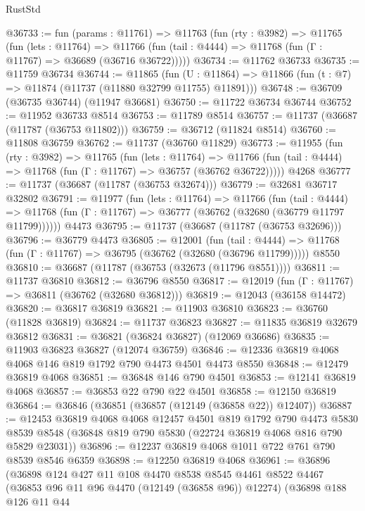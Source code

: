 \begin{lexlean}{RustStd}
\begin{coremodule}
@36733 := fun (params : @11761) =>
  @11763
    (fun (rty : @3982) =>
    @11765
      (fun (lets : @11764) =>
      @11766 (fun (tail : @4444) => @11768 (fun (Γ : @11767) => @36689 (@36716 @36722)))))
@36734 := @11762 @36733
@36735 := @11759 @36734
@36744 := @11865
    (fun (U : @11864) => @11866 (fun (t : @7) => @11874 (@11737 (@11880 @32799 @11755) @11891)))
@36748 := @36709 (@36735 @36744) (@11947 @36681)
@36750 := @11722 @36734 @36744
@36752 := @11952 @36733 @8514
@36753 := @11789 @8514
@36757 := @11737 (@36687 (@11787 (@36753 @11802)))
@36759 := @36712 (@11824 @8514)
@36760 := @11808 @36759
@36762 := @11737 (@36760 @11829)
@36773 := @11955
    (fun (rty : @3982) =>
    @11765
      (fun (lets : @11764) =>
      @11766 (fun (tail : @4444) => @11768 (fun (Γ : @11767) => @36757 (@36762 @36722)))))
    @4268
@36777 := @11737 (@36687 (@11787 (@36753 @32674)))
@36779 := @32681 @36717 @32802
@36791 := @11977
    (fun (lets : @11764) =>
    @11766
      (fun (tail : @4444) =>
      @11768 (fun (Γ : @11767) => @36777 (@36762 (@32680 (@36779 @11797 @11799))))))
    @4473
@36795 := @11737 (@36687 (@11787 (@36753 @32696)))
@36796 := @36779 @4473
@36805 := @12001
    (fun (tail : @4444) => @11768 (fun (Γ : @11767) => @36795 (@36762 (@32680 (@36796 @11799)))))
    @8550
@36810 := @36687 (@11787 (@36753 (@32673 (@11796 @8551))))
@36811 := @11737 @36810
@36812 := @36796 @8550
@36817 := @12019 (fun (Γ : @11767) => @36811 (@36762 (@32680 @36812)))
@36819 := @12043 (@36158 @14472)
@36820 := @36817 @36819
@36821 := @11903 @36810
@36823 := @36760 (@11828 @36819)
@36824 := @11737 @36823
@36827 := @11835 @36819 @32679 @36812
@36831 := @36821 (@36824 @36827) (@12069 @36686)
@36835 := @11903 @36823 @36827 (@12074 @36759)
@36846 := @12336 @36819 @4068 @4068 @146 @819 @1792 @790 @4473 @4501 @4473 @8550
@36848 := @12479 @36819 @4068
@36851 := @36848 @146 @790 @4501
@36853 := @12141 @36819 @4068
@36857 := @36853 @22 @790 @22 @4501
@36858 := @12150 @36819
@36864 := @36846 (@36851 (@36857 (@12149 (@36858 @22)) @12407))
@36887 := @12453
    @36819
    @4068
    @4068
    @12457
    @4501
    @819
    @1792
    @790
    @4473
    @5830
    @8539
    @8548
    (@36848 @819 @790 @5830 (@22724 @36819 @4068 @816 @790 @5829 @23031))
@36896 := @12237 @36819 @4068 @1011 @722 @761 @790 @8539 @8546 @6359
@36898 := @12250 @36819 @4068
@36961 := @36896
    (@36898
      @124
      @427
      @11
      @108
      @4470
      @8538
      @8545
      @4461
      @8522
      @4467
      (@36853 @96 @11 @96 @4470 (@12149 (@36858 @96)) @12274)
      (@36898
        @188
        @126
        @11
        @44

\end{coremodule}
\end{lexlean}
